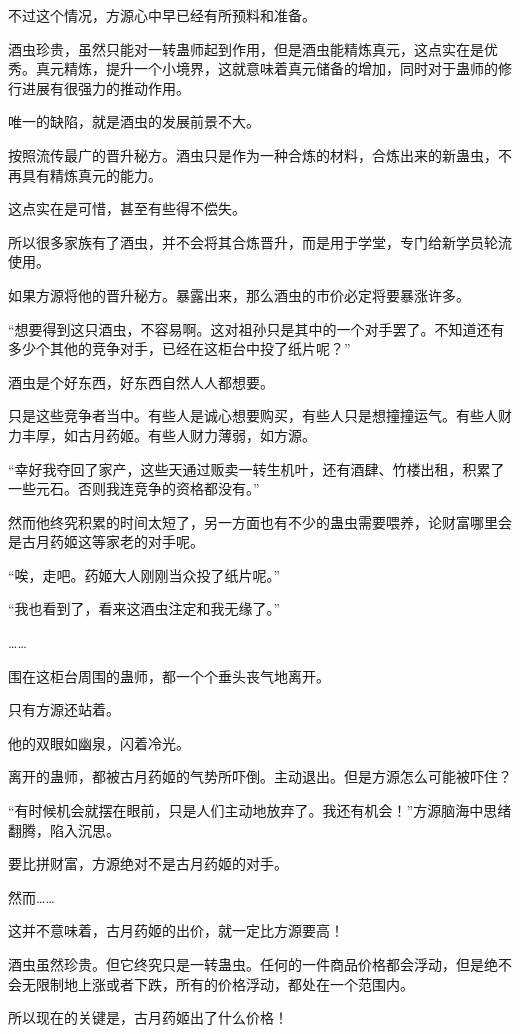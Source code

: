 \begin{this_body}
不过这个情况，方源心中早已经有所预料和准备。

酒虫珍贵，虽然只能对一转蛊师起到作用，但是酒虫能精炼真元，这点实在是优秀。真元精炼，提升一个小境界，这就意味着真元储备的增加，同时对于蛊师的修行进展有很强力的推动作用。

唯一的缺陷，就是酒虫的发展前景不大。

按照流传最广的晋升秘方。酒虫只是作为一种合炼的材料，合炼出来的新蛊虫，不再具有精炼真元的能力。

这点实在是可惜，甚至有些得不偿失。

所以很多家族有了酒虫，并不会将其合炼晋升，而是用于学堂，专门给新学员轮流使用。

如果方源将他的晋升秘方。暴露出来，那么酒虫的市价必定将要暴涨许多。

“想要得到这只酒虫，不容易啊。这对祖孙只是其中的一个对手罢了。不知道还有多少个其他的竞争对手，已经在这柜台中投了纸片呢？”

酒虫是个好东西，好东西自然人人都想要。

只是这些竞争者当中。有些人是诚心想要购买，有些人只是想撞撞运气。有些人财力丰厚，如古月药姬。有些人财力薄弱，如方源。

“幸好我夺回了家产，这些天通过贩卖一转生机叶，还有酒肆、竹楼出租，积累了一些元石。否则我连竞争的资格都没有。”

然而他终究积累的时间太短了，另一方面也有不少的蛊虫需要喂养，论财富哪里会是古月药姬这等家老的对手呢。

“唉，走吧。药姬大人刚刚当众投了纸片呢。”

“我也看到了，看来这酒虫注定和我无缘了。”

……

围在这柜台周围的蛊师，都一个个垂头丧气地离开。

只有方源还站着。

他的双眼如幽泉，闪着冷光。

离开的蛊师，都被古月药姬的气势所吓倒。主动退出。但是方源怎么可能被吓住？

“有时候机会就摆在眼前，只是人们主动地放弃了。我还有机会！”方源脑海中思绪翻腾，陷入沉思。

要比拼财富，方源绝对不是古月药姬的对手。

然而……

这并不意味着，古月药姬的出价，就一定比方源要高！

酒虫虽然珍贵。但它终究只是一转蛊虫。任何的一件商品价格都会浮动，但是绝不会无限制地上涨或者下跌，所有的价格浮动，都处在一个范围内。

所以现在的关键是，古月药姬出了什么价格！


\end{this_body}
